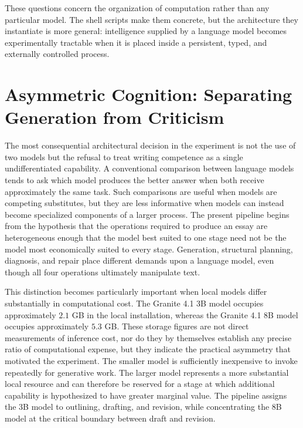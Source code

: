 \documentclass[11pt]{article}
\begin{document}
These questions concern the organization of computation rather than any particular model. The shell scripts make them concrete, but the architecture they instantiate is more general: intelligence supplied by a language model becomes experimentally tractable when it is placed inside a persistent, typed, and externally controlled process.

\section{Asymmetric Cognition: Separating Generation from Criticism}

The most consequential architectural decision in the experiment is not the use of two models but the refusal to treat writing competence as a single undifferentiated capability. A conventional comparison between language models tends to ask which model produces the better answer when both receive approximately the same task. Such comparisons are useful when models are competing substitutes, but they are less informative when models can instead become specialized components of a larger process. The present pipeline begins from the hypothesis that the operations required to produce an essay are heterogeneous enough that the model best suited to one stage need not be the model most economically suited to every stage. Generation, structural planning, diagnosis, and repair place different demands upon a language model, even though all four operations ultimately manipulate text.

This distinction becomes particularly important when local models differ substantially in computational cost. The Granite 4.1 3B model occupies approximately \(2.1\) GB in the local installation, whereas the Granite 4.1 8B model occupies approximately \(5.3\) GB. These storage figures are not direct measurements of inference cost, nor do they by themselves establish any precise ratio of computational expense, but they indicate the practical asymmetry that motivated the experiment. The smaller model is sufficiently inexpensive to invoke repeatedly for generative work. The larger model represents a more substantial local resource and can therefore be reserved for a stage at which additional capability is hypothesized to have greater marginal value. The pipeline assigns the 3B model to outlining, drafting, and revision, while concentrating the 8B model at the critical boundary between draft and revision.
\end{document}
